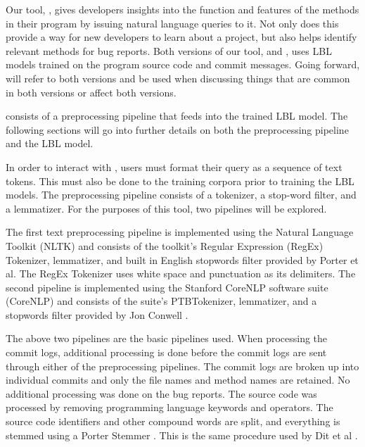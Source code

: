 \label{sec:method}

Our tool, \textit{\projname}, gives developers insights into the function and 
features of the methods in their program by issuing natural language queries to 
it. Not only does this provide a way for new developers to learn about a 
project, but also helps identify relevant methods for bug reports. Both 
versions of our tool, \textit{\projnameA} and \textit{\projnameB}, uses LBL 
models trained on the program source code and commit messages.
Going forward, \textit{\projname} will refer to both versions and be used when 
discussing things that are common in both versions or affect both versions.

\textit{\projname} consists of a preprocessing pipeline that feeds into the
trained LBL model. The following sections will go into further details on both
the preprocessing pipeline and the LBL model.

\label{subsec:method_preproc}

In order to interact with \textit{\projname}, users must format their query as
a sequence of text tokens. This must also be done to the training corpora prior
to training the LBL models. The preprocessing pipeline consists of a tokenizer,
a stop-word filter, and a lemmatizer. For the purposes of this tool, two 
pipelines will be explored.

The first text preprocessing pipeline is implemented using the
Natural Language Toolkit (NLTK) \cite{bird2009natural} and consists of the
toolkit's Regular Expression (RegEx) Tokenizer, lemmatizer, and built in 
English stopwords filter provided by Porter et al. The RegEx Tokenizer uses 
white space and punctuation as its delimiters.
The second pipeline is implemented using the Stanford CoreNLP software suite 
(CoreNLP) \cite{manning2014stanford} and consists of the suite's PTBTokenizer,
lemmatizer, and a stopwords filter provided by Jon Conwell
\cite{jconwellcorenlp}.

The above two pipelines are the basic pipelines used. When processing
the commit logs, additional processing is done before the commit logs are
sent through either of the preprocessing pipelines. The commit logs are
broken up into individual commits and only the file names and method names
are retained. No additional processing was done on the bug reports. The source
code was processed by removing programming language keywords and operators.
The source code identifiers and other compound words are split, and everything
is stemmed using a Porter Stemmer \cite{porter1980algorithm}. This is the
same procedure used by Dit et al \cite{dit2013integrating}.

